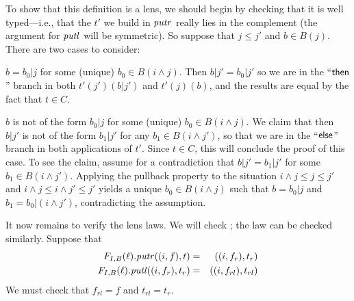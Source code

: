 \begin{defn}[$R$-similarity]
\begin{theorem}
\begin{lemma}
\begin{theorem}[No products]
\begin{lemma}
\begin{defn}
\begin{theorem}
\begin{theorem}
\begin{corollary}[Hylomorphism]
\begin{defn}
\begin{defn}
\iffull
\begin{goodlens}
To show that this definition is a lens, we should begin by checking   that it
is well typed---i.e., that the $t'$ we build in $\mathit{putr}$ really lies in the
complement (the argument for $\mathit{putl}$ will be symmetric).
%
So suppose that $j\leq{}j'$ and $b{\in}B(j)$.  There are two cases to consider:
\begin{longenum}
\item $b=b_0|j$ for some (unique) $b_0{\in}B(i{\wedge}j)$. Then $b|j' = b_0|j'$
so we are in the ``$\mathsf{then}$'' branch in both $t'(j')(b|j')$ and
$t'(j)(b)$, and the results are equal by the fact that $t \in C$.
%

\item $b$ is not of the form $b_0|j$ for some (unique)
$b_0{\in}B(i{\wedge}j)$. We claim that then $b|j'$ is not of the form
$b_1|j'$ for any $b_1{\in}B(i{\wedge}j')$, so that we are in the
``$\mathsf{else}$'' branch in both applications of $t'$. Since $t \in C$, this
will conclude the proof of this case. To see the claim, assume for a
contradiction that $b|j' = b_1|j'$ for some $b_1{\in}B(i{\wedge}j')$.
Applying the pullback property to the situation $i{\wedge}j \leq{} j \leq{}
j'$ and $i{\wedge}j \leq{} i{\wedge}j' \leq{} j'$ yields a unique
$b_0{\in}B(i{\wedge}j)$ such that $b=b_0|j$ and $b_1=b_0|(i{\wedge}j')$,
contradicting the assumption.
\end{longenum}
It now remains to verify the lens laws. We will check ; the
 law can be checked similarly. Suppose that
\begin{eqnarray*}
    F_{I,B}(\ell).\mathit{putr}((i,f),t) &=& ((i,f_r),t_r) \\
    F_{I,B}(\ell).\mathit{putl}((i,f_r),t_r) &=& ((i,f_{rl}),t_{rl})
\end{eqnarray*}
We must check that $f_{rl}=f$ and $t_{rl}=t_r$.


\end{goodlens}
\end{defn}
\end{defn}
\end{corollary}
\end{theorem}
\end{theorem}
\end{defn}
\end{lemma}
\end{theorem}
\end{lemma}
\end{theorem}
\end{defn}
